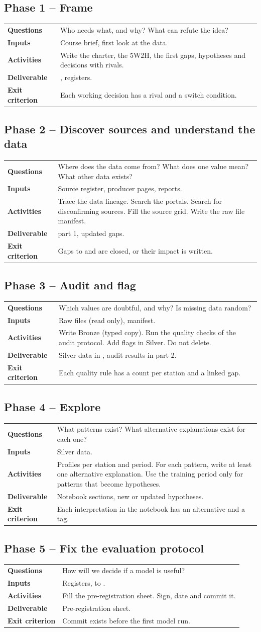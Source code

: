\documentclass[11pt]{article}
\begin{document}
\newcommand{\phase}[6]{%
\subsection{#1}
\begin{tabularx}{\linewidth}{@{}l X@{}}
\textbf{Questions} & #2 \\
\textbf{Inputs} & #3 \\
\textbf{Activities} & #4 \\
\textbf{Deliverable} & #5 \\
\textbf{Exit criterion} & #6 \\
\end{tabularx}}

\phase{Phase 1 -- Frame}
{Who needs what, and why? What can refute the idea?}
{Course brief, first look at the data.}
{Write the charter, the 5W2H, the first gaps, hypotheses and decisions with rivals.}
{\fpath{product-charter.pdf}, registers.}
{Each working decision has a rival and a switch condition.}

\phase{Phase 2 -- Discover sources and understand the data}
{Where does the data come from? What does one value mean? What other data exists?}
{Source register, producer pages, reports.}
{Trace the data lineage. Search the portals. Search for disconfirming sources. Fill the source grid. Write the raw file manifest.}
{\fpath{data.pdf} part 1, updated gaps.}
{Gaps \refid{G-01} to \refid{G-03} and \refid{G-13} are closed, or their impact is written.}

\phase{Phase 3 -- Audit and flag}
{Which values are doubtful, and why? Is missing data random?}
{Raw files (read only), manifest.}
{Write Bronze (typed copy). Run the quality checks of the audit protocol. Add flags in Silver. Do not delete.}
{Silver data in \fpath{spark/lake/silver/}, audit results in \fpath{data.pdf} part 2.}
{Each quality rule has a count per station and a linked gap.}

\phase{Phase 4 -- Explore}
{What patterns exist? What alternative explanations exist for each one?}
{Silver data.}
{Profiles per station and period. For each pattern, write at least one alternative explanation. Use the training period only for patterns that become hypotheses.}
{Notebook sections, new or updated hypotheses.}
{Each interpretation in the notebook has an alternative and a tag.}

\phase{Phase 5 -- Fix the evaluation protocol}
{How will we decide if a model is useful?}
{Registers, \refid{D-003} to \refid{D-007}.}
{Fill the pre-registration sheet. Sign, date and commit it.}
{Pre-registration sheet.}
{Commit exists before the first model run.}
\end{document}
